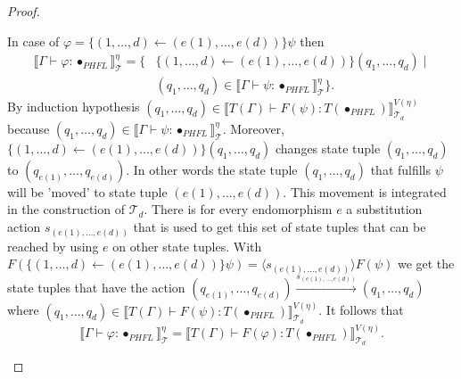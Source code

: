 \begin{proof}
\begin{compactitem}
        \item In case of $\varphi = \{(1, \dots, d) \leftarrow (e(1), \dots, e(d))\} \psi$ then
        \begin{align*}
            \llbracket \Gamma \vdash \varphi \colon \bullet_{PHFL} \rrbracket^\eta_\mathcal{T} = \{&\{(1, \dots, d)
            \leftarrow (e(1), \dots, e(d))\}(q_1, \dots, q_d) \mid \\&(q_1, \dots, q_d) \in \llbracket \Gamma \vdash
            \psi \colon \bullet_{PHFL} \rrbracket^\eta_\mathcal{T}\}.
        \end{align*}
        By induction hypothesis $({q_1}, \dots, {q_d}) \in \llbracket T(\Gamma) \vdash F(\psi) \colon T
        (\bullet_{PHFL}) \rrbracket^{V(\eta)}_{\mathcal{T}_d}$ because $({q_1}, \dots, {q_d}) \in \llbracket \Gamma
        \vdash \psi \colon \bullet_{PHFL} \rrbracket^\eta_\mathcal{T}$.
        Moreover, $\{(1, \dots, d)\leftarrow (e(1), \dots, e(d))\}(q_1, \dots, q_d)$ changes state tuple $(q_1,
        \dots, q_d)$ to $(q_{e(1)},\dots, q_{e(d)})$. In other words the state tuple $(q_1, \dots, q_d)$ that
        fulfills $\psi$ will be 'moved' to state tuple $(e(1), \dots, e(d))$. This movement is integrated in the
        construction of $\mathcal{T}_d$. There is for every endomorphism $e$ a
        substitution action $s_{(e(1), \dots, e(d))}$ that is used to get this set of state tuples that can be
        reached by using $e$ on other state tuples. With $F(\{(1, \dots, d) \leftarrow (e(1), \dots, e(d))\}
        \psi) = \langle s_{(e(1), \dots, e(d))} \rangle F(\psi)$ we get the state tuples that have the action $(q_{e
        (1)}, \dots, q_{e(d)}) \overset{s_{(e(1), \dots, e(d))}}{\rightarrow} (q_1, \dots, q_d)$ where $(q_1, \dots,
        q_d) \in \llbracket T(\Gamma) \vdash F(\psi) \colon T(\bullet_{PHFL}) \rrbracket^{V(\eta)}_{\mathcal{T}_d}$.
        It follows that
        \[\llbracket \Gamma \vdash \varphi \colon \bullet_{PHFL} \rrbracket^\eta_\mathcal{T} = \llbracket T(\Gamma)
        \vdash F(\varphi) \colon T(\bullet_{PHFL}) \rrbracket^{V(\eta)}_{\mathcal{T}_d}.\]


\end{compactitem}
\end{proof}
